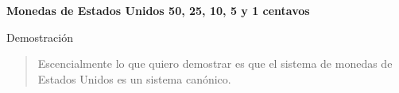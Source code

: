 \textbf{Monedas de Estados Unidos 50, 25, 10, 5 y 1 centavos}\vspace{.2cm}

\textcolor{bibi}{Demostración}
\begin{quote}
    Escencialmente lo que quiero demostrar es que el sistema de monedas de Estados Unidos es un sistema canónico. 
\end{quote}